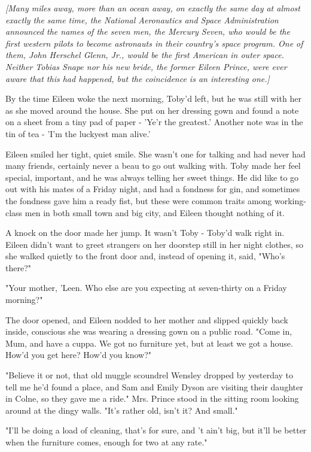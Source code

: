 \emph{[Many miles away, more than an ocean away, on exactly the same day at almost exactly the same time, the National Aeronautics and Space Administration announced the names of the seven men, the Mercury Seven, who would be the first western pilots to become astronauts in their country's space program. One of them, John Herschel Glenn, Jr., would be the first American in outer space. Neither Tobias Snape nor his new bride, the former Eileen Prince, were ever aware that this had happened, but the coincidence is an interesting one.]}

By the time Eileen woke the next morning, Toby'd left, but he was still with her as she moved around the house. She put on her dressing gown and found a note on a sheet from a tiny pad of paper - 'Ye'r the greatest.' Another note was in the tin of tea - 'I'm the luckyest man alive.'

Eileen smiled her tight, quiet smile. She wasn't one for talking and had never had many friends, certainly never a beau to go out walking with. Toby made her feel special, important, and he was always telling her sweet things. He did like to go out with his mates of a Friday night, and had a fondness for gin, and sometimes the fondness gave him a ready fist, but these were common traits among working-class men in both small town and big city, and Eileen thought nothing of it.

A knock on the door made her jump. It wasn't Toby - Toby'd walk right in. Eileen didn't want to greet strangers on her doorstep still in her night clothes, so she walked quietly to the front door and, instead of opening it, said, "Who's there?"

"Your mother, 'Leen. Who else are you expecting at seven-thirty on a Friday morning?"

The door opened, and Eileen nodded to her mother and slipped quickly back inside, conscious she was wearing a dressing gown on a public road. "Come in, Mum, and have a cuppa. We got no furniture yet, but at least we got a house. How'd you get here? How'd you know?"

"Believe it or not, that old muggle scoundrel Wensley dropped by yesterday to tell me he'd found a place, and Sam and Emily Dyson are visiting their daughter in Colne, so they gave me a ride." Mrs. Prince stood in the sitting room looking around at the dingy walls. "It's rather old, isn't it? And small."

"I'll be doing a load of cleaning, that's for sure, and 't ain't big, but it'll be better when the furniture comes, enough for two at any rate."

